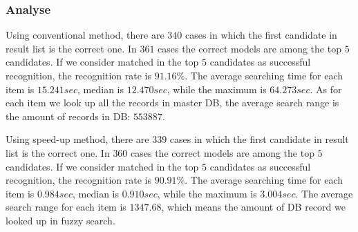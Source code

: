 \documentclass[technicalreport]{ieicej}
\begin{document}
        \subsubsection{Analyse}

            Using conventional method, there are $340$ cases in which the first candidate in result list is the correct one. In $361$ cases the correct models are among the top $5$ candidates. If we consider matched in the top $5$ candidates as successful recognition, the recognition rate is $91.16\%$. The average searching time for each item is $15.241sec$, median is $12.470sec$, while the maximum is $64.273sec$. As for each item we look up all the records in master DB, the average search range is the amount of records in DB: $553887$.
            
            Using speed-up method, there are $339$ cases in which the first candidate in result list is the correct one. In $360$ cases the correct models are among the top $5$ candidates. If we consider matched in the top $5$ candidates as successful recognition, the recognition rate is $90.91\%$. The average searching time for each item is $0.984sec$, median is $0.910sec$, while the maximum is $3.004sec$. The average search range for each item is $1347.68$, which means the amount of DB record we looked up in fuzzy search.
\end{document}
